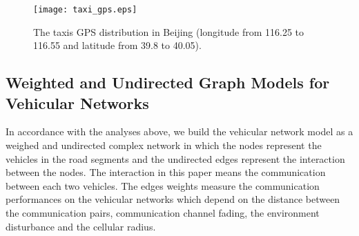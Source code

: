 \documentclass[journal,12pt,draftclsnofoot,onecolumn]{IEEEtran}
\begin{document}
\begin{figure}[!t]
  \centering
\texttt{[image: taxi\_gps.eps]}
  \caption{\!The taxis GPS distribution in Beijing (longitude from 116.25 to 116.55 and latitude from 39.8 to 40.05).}\label{taxi GPS}
\end{figure}



\subsection{Weighted and Undirected Graph Models for Vehicular Networks}
\label{3-2}
In accordance with the analyses above, we build the vehicular network model as a weighed and undirected complex network in which the nodes represent the vehicles in the road segments and the undirected edges represent the interaction between the nodes. The interaction in this paper means the communication between each two vehicles. The edges weights measure the communication performances on the vehicular networks which depend on the distance between the communication pairs, communication channel fading, the environment disturbance and the cellular radius.
\end{document}
